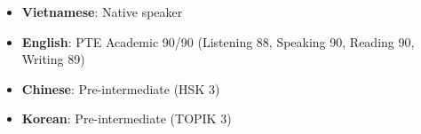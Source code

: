 %
%
%


{
\begin{itemize}
	\item \textbf{Vietnamese}: Native speaker
	\item \textbf{English}: PTE Academic 90/90 
	(Listening 88, Speaking 90, Reading 90, Writing 89)
	\item \textbf{Chinese}: Pre-intermediate (HSK 3)
	\item \textbf{Korean}: Pre-intermediate (TOPIK 3)
\end{itemize}}


